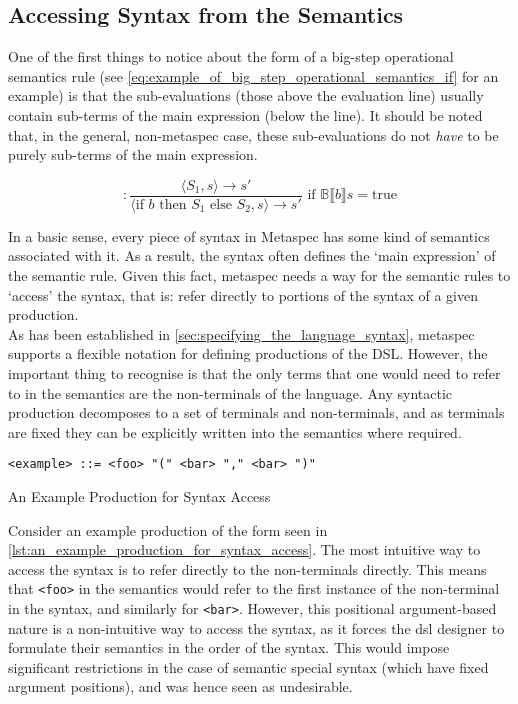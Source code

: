 \subsection{Accessing Syntax from the Semantics} %
\label{sub:accessing_syntax_from_the_semantics}
One of the first things to notice about the form of a big-step operational semantics rule (see \autoref{eq:example_of_big_step_operational_semantics_if} for an example) is that the sub-evaluations (those above the evaluation line) usually contain sub-terms of the main expression (below the line).
It should be noted that, in the general, non-metaspec case, these sub-evaluations do not \textit{have} to be purely sub-terms of the main expression. 

\begin{equation}
    [\text{if}] : \frac{\langle S_1, s \rangle \to s'}{\langle \text{if } b \text{ then } S_1 \text{ else } S_2, s\rangle \to s'} \text{ if } \mathbb{B}\llbracket b \rrbracket s = \text{true}
    \label{eq:example_of_big_step_operational_semantics_if}
\end{equation}

In a basic sense, every piece of syntax in Metaspec has some kind of semantics associated with it.
As a result, the syntax often defines the `main expression' of the semantic rule.
Given this fact, \gls{metaspec} needs a way for the semantic rules to `access' the syntax, that is: refer directly to portions of the syntax of a given production. \\

As has been established in \autoref{sec:specifying_the_language_syntax}, \gls{metaspec} supports a flexible notation for defining productions of the DSL. 
However, the important thing to recognise is that the only terms that one would need to refer to in the semantics are the non-terminals of the language. 
Any syntactic production decomposes to a set of terminals and non-terminals, and as terminals are fixed they can be explicitly written into the semantics where required. \\

\begin{listing}[!htb]
\begin{verbatim}
<example> ::= <foo> "(" <bar> "," <bar> ")"
\end{verbatim}
\caption{An Example Production for Syntax Access}
\label{lst:an_example_production_for_syntax_access}
\end{listing}

Consider an example production of the form seen in \autoref{lst:an_example_production_for_syntax_access}. 
The most intuitive way to access the syntax is to refer directly to the non-terminals directly.
This means that \texttt{<foo>} in the semantics would refer to the first instance of the non-terminal in the syntax, and similarly for \texttt{<bar>}.
However, this positional argument-based nature is a non-intuitive way to access the syntax, as it forces the \gls{dsl} designer to formulate their semantics in the order of the syntax. 
This would impose significant restrictions in the case of semantic special syntax (which have fixed argument positions), and was hence seen as undesirable.\\

